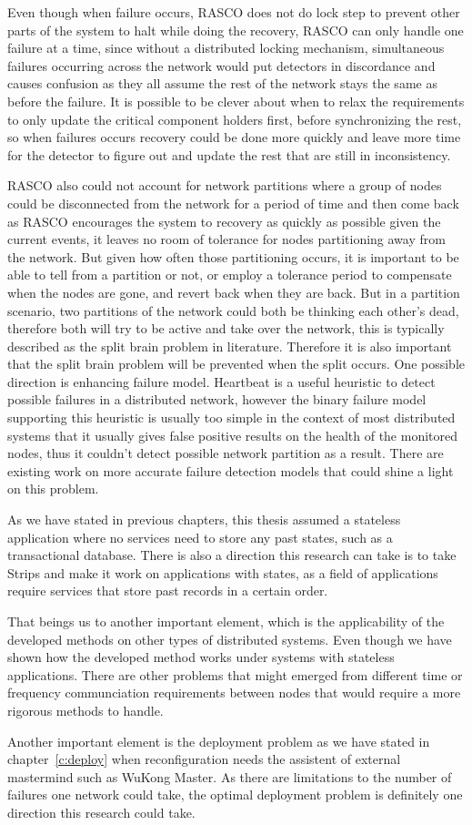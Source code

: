 Even though when failure occurs, RASCO does not do lock step to prevent other parts of the system to halt while doing the recovery, RASCO can only handle one failure at a time, since without a distributed locking mechanism, simultaneous failures occurring across the network would put detectors in discordance and causes confusion as they all assume the rest of the network stays the same as before the failure. It is possible to be clever about when to relax the requirements to only update the critical component holders first, before synchronizing the rest, so when failures occurs recovery could be done more quickly and leave more time for the detector to figure out and update the rest that are still in inconsistency. 

RASCO also could not account for network partitions where a group of nodes could be disconnected from the network for a period of time and then come back as RASCO encourages the system to recovery as quickly as possible given the current events, it leaves no room of tolerance for nodes partitioning away from the network. But given how often those partitioning occurs, it is important to be able to tell from a partition or not, or employ a tolerance period to compensate when the nodes are gone, and revert back when they are back. But in a partition scenario, two partitions of the network could both be thinking each other's dead, therefore both will try to be active and take over the network, this is typically described as the split brain problem in literature. Therefore it is also important that the split brain problem will be prevented when the split occurs. One possible direction is enhancing failure model. Heartbeat is a useful heuristic to detect possible failures in a distributed network, however the binary failure model supporting this heuristic is usually too simple in the context of most distributed systems that it usually gives false positive results on the health of the monitored nodes, thus it couldn't detect possible network partition as a result. There are existing work on more accurate failure detection models that could shine a light on this problem.

As we have stated in previous chapters, this thesis assumed a stateless application where no services need to store any past states, such as a transactional database. There is also a direction this research can take is to take Strips and make it work on applications with states, as a field of applications require services that store past records in a certain order.

That beings us to another important element, which is the applicability of the developed methods on other types of distributed systems. Even though we have shown how the developed method works under systems with stateless applications. There are other problems that might emerged from different time or frequency communciation requirements between nodes that would require a more rigorous methods to handle.

Another important element is the deployment problem as we have stated in chapter~\ref{c:deploy} when reconfiguration needs the assistent of external mastermind such as WuKong Master. As there are limitations to the number of failures one network could take, the optimal deployment problem is definitely one direction this research could take. 

